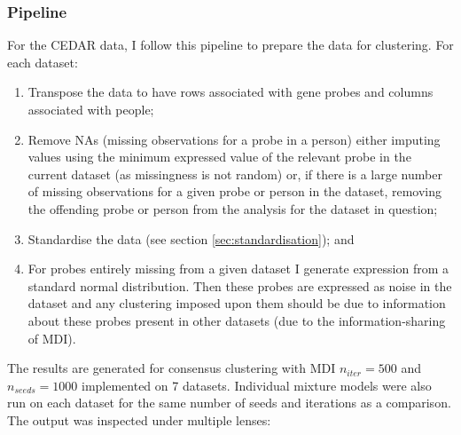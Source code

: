 \documentclass[12pt]{article} %
\begin{document}
 	\subsubsection{Pipeline}
	For the CEDAR data, I follow this pipeline to prepare the data for clustering. For each dataset:
	\begin{enumerate} \label{list:methods}
		\item Transpose the data to have rows associated with gene probes and columns associated with people;
		\item Remove NAs (missing observations for a probe in a person) either imputing values using the minimum expressed value of the relevant probe in the current dataset (as missingness is not random) or, if there is a large number of missing observations for a given probe or person in the dataset, removing the offending probe or person from the analysis for the dataset in question;
		\item Standardise the data (see section \ref{sec:standardisation}); and
		\item For probes entirely missing from a given dataset I generate expression from a standard normal distribution. Then these probes are expressed as noise in the dataset and any clustering imposed upon them should be due to information about these probes present in other datasets (due to the information-sharing of MDI). %
	\end{enumerate}

	The results are generated for consensus clustering with MDI $n_{iter}=500$ and $n_{seeds}=1000$ implemented on 7 datasets. Individual mixture models were also run on each dataset for the same number of seeds and iterations as a comparison. The output was inspected under multiple lenses: 
	
\end{document}
